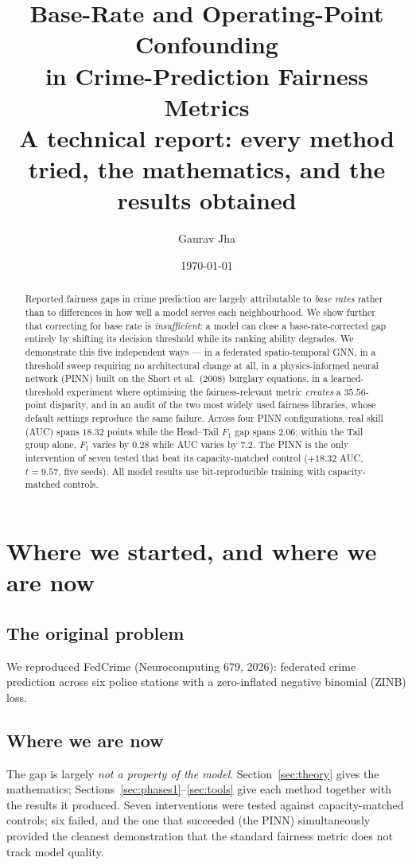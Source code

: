 \documentclass[11pt,a4paper]{article}
\title{\textbf{Base-Rate and Operating-Point Confounding\\in Crime-Prediction Fairness Metrics}\\[4pt]
\large A technical report: every method tried, the mathematics, and the results obtained}
\author{Gaurav Jha}
\date{\today}
\begin{document}
\maketitle

\begin{abstract}
\noindent
Reported fairness gaps in crime prediction are largely attributable to
\emph{base rates} rather than to differences in how well a model serves each
neighbourhood. We show further that correcting for base rate is
\emph{insufficient}: a model can close a base-rate-corrected gap entirely by
shifting its decision threshold while its ranking ability degrades. We
demonstrate this five independent ways --- in a federated spatio-temporal GNN,
in a threshold sweep requiring no architectural change at all, in a
physics-informed neural network (PINN) built on the Short et al.\ (2008)
burglary equations, in a learned-threshold experiment where optimising the
fairness-relevant metric \emph{creates} a $35.56$-point disparity, and in an
audit of the two most widely used fairness libraries, whose default settings
reproduce the same failure. Across four PINN configurations, real skill (AUC)
spans $18.32$ points while the Head--Tail $F_1$ gap spans $2.06$; within the
Tail group alone, $F_1$ varies by $0.28$ while AUC varies by $7.2$. The PINN is
the only intervention of seven tested that beat its capacity-matched control
($+18.32$ AUC, $t = 9.57$, five seeds). All model results use bit-reproducible
training with capacity-matched controls.
\end{abstract}

\tableofcontents

\section{Where we started, and where we are now}

\subsection{The original problem}
We reproduced FedCrime (Neurocomputing 679, 2026): federated crime prediction
across six police stations with a zero-inflated negative binomial (ZINB) loss.

\subsection{Where we are now}
The gap is largely \emph{not a property of the model}. Section~\ref{sec:theory}
gives the mathematics; Sections~\ref{sec:phases1}--\ref{sec:tools} give each
method together with the results it produced. Seven interventions were tested
against capacity-matched controls; six failed, and the one that succeeded
(the PINN) simultaneously provided the cleanest demonstration that the standard
fairness metric does not track model quality.
\end{document}
